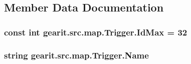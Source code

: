 \subsection{Member Data Documentation}
\hypertarget{classgearit_1_1src_1_1map_1_1_trigger_aefa6f32ee5c2e56b0d8c558327ad8047}{
\subsubsection[{Id\+Max}]{\setlength{\rightskip}{0pt plus 5cm}const int gearit.\+src.\+map.\+Trigger.\+Id\+Max = 32}}\label{classgearit_1_1src_1_1map_1_1_trigger_aefa6f32ee5c2e56b0d8c558327ad8047}
\hypertarget{classgearit_1_1src_1_1map_1_1_trigger_a7a0302a533e52923f3e25a088825808a}{
\subsubsection[{Name}]{\setlength{\rightskip}{0pt plus 5cm}string gearit.\+src.\+map.\+Trigger.\+Name}}\label{classgearit_1_1src_1_1map_1_1_trigger_a7a0302a533e52923f3e25a088825808a}


